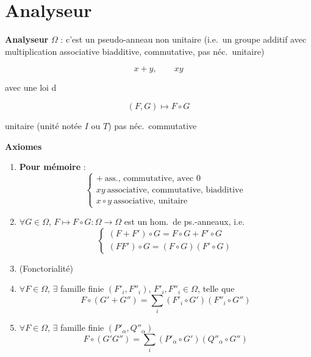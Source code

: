 \documentclass[11pt,a4paper]{article}
\begin{document}
\section*{Analyseur}



\textbf{Analyseur} $\Omega$ : c'est un pseudo-anneau non unitaire (i.e.\ un
groupe additif avec multiplication associative biadditive, commutative, pas
néc.\ unitaire)

\ill{} 
\[
x+y, \qquad xy
\]

avec une loi d 

\[
(F,G) \longmapsto F \circ G
\]

unitaire (unité notée  $I$ ou $T$) pas néc.\ commutative


\textbf{Axiomes}

\begin{enumerate}
\item[1)] \textbf{Pour mémoire} :
\[
\begin{cases}
+ \ \text{ass., commutative, avec } 0 \\
xy \ \text{associative, commutative, biadditive} \\
x \circ y \ \text{associative, unitaire}
\end{cases}
\]

\item[2)] $\forall G \in \Omega$, $F \longmapsto F \circ G : \Omega \to \Omega$ est un hom.\ de
ps.-anneaux, i.e.
\[
\begin{cases}
(F+F') \circ G = F \circ G + F' \circ G \\
(FF') \circ G = (F \circ G)(F' \circ G)
\end{cases}
\]

\item[3)] (Fonctorialité)

\item[a)] $\forall F \in \Omega$, $\exists$ famille finie
$(F'_i, F''_i)$, $F'_i, F''_i \in \Omega$, telle que
\[
F \circ (G' + G'') = \sum_i (F'_i \circ G')(F''_i \circ G'')
\]

\item[b)] $\forall F \in \Omega$, $\exists$ famille finie
$(P'_\alpha, Q''_\alpha)$
\[
F \circ (G'G'') = \sum_i (P'_\alpha \circ G')(Q''_\alpha \circ G'')
\]
\end{enumerate}
\end{document}
